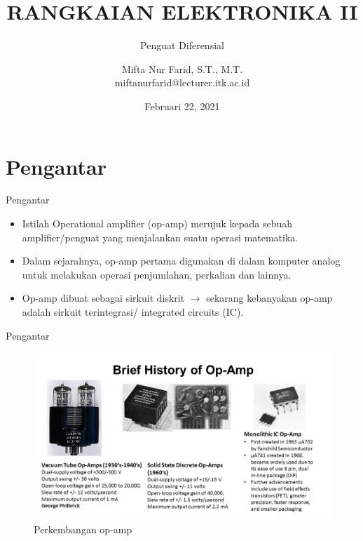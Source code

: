\documentclass[aspectratio=169]{beamer}
\author{Mifta Nur Farid, S.T., M.T. \\
	miftanurfarid@lecturer.itk.ac.id}
\title{RANGKAIAN ELEKTRONIKA II}
\subtitle{Penguat Diferensial}
\institute{Teknik Elektro \\ Institut Teknologi Kalimantan \\ Balikpapan, Indonesia}
\date{\tiny Februari 22, 2021}
\begin{document}
\begin{frame}[t,plain]
\titlepage
\end{frame}


\section{Pengantar}
\begin{frame}{Pengantar}
	\begin{itemize}
		\item Istilah Operational amplifier (op-amp) merujuk kepada sebuah amplifier/penguat yang menjalankan suatu operasi matematika.
		\item Dalam sejarahnya, op-amp pertama digunakan di dalam komputer analog untuk melakukan operasi penjumlahan, perkalian dan lainnya.
		\item Op-amp dibuat sebagai sirkuit diskrit $ \rightarrow $ sekarang kebanyakan op-amp adalah sirkuit terintegrasi/ integrated circuits (IC). 
	\end{itemize}
\end{frame}

\begin{frame}{Pengantar}
	\begin{figure}
		\centering
		\includegraphics[height=0.75\textheight]{gambar/01.history-op-amp}
		\caption{Perkembangan op-amp}
		\label{fig:history-op-amp}
	\end{figure}
\end{frame}
\end{document}
